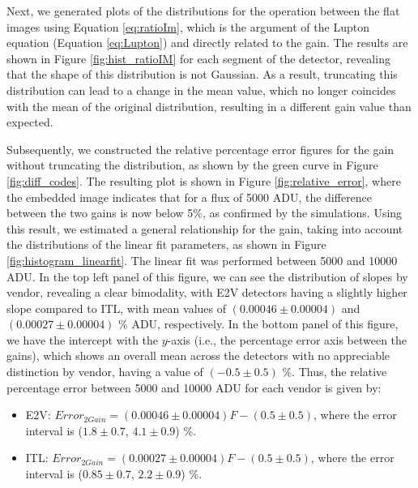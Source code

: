  Next, we generated plots of the distributions for the operation between the flat images using Equation \ref{eq:ratioIm}, which is the argument of the Lupton equation (Equation \ref{eq:Lupton}) and directly related to the gain. The results are shown in Figure \ref{fig:hist_ratioIM} for each segment of the detector, revealing that the shape of this distribution is not Gaussian. As a result, truncating this distribution can lead to a change in the mean value, which no longer coincides with the mean of the original distribution, resulting in a different gain value than expected.
 
\vspace{3mm}

Subsequently, we constructed the relative percentage error figures for the gain without truncating the distribution, as shown by the green curve in Figure \ref{fig:diff_codes}. The resulting plot is shown in Figure \ref{fig:relative_error}, where the embedded image indicates that for a flux of 5000 ADU, the difference between the two gains is now below 5\%, as confirmed by the simulations. Using this result, we estimated a general relationship for the gain, taking into account the distributions of the linear fit parameters, as shown in Figure \ref{fig:histogram_linearfit}. The linear fit was performed between 5000 and 10000 ADU. In the top left panel of this figure, we can see the distribution of slopes by vendor, revealing a clear bimodality, with E2V detectors having a slightly higher slope compared to ITL, with mean values of $(0.00046 \pm 0.00004)$ and $(0.00027 \pm 0.00004)$ \% ADU, respectively. In the bottom panel of this figure, we have the intercept with the $y$-axis (i.e., the percentage error axis between the gains), which shows an overall mean across the detectors with no appreciable distinction by vendor, having a value of $(-0.5 \pm 0.5)$ \%. Thus, the relative percentage error between 5000 and 10000 ADU for each vendor is given by:

\begin{itemize}
    \item E2V: $Error_{2Gain} = (0.00046 \pm 0.00004) F - (0.5 \pm 0.5)$, where the error interval is ($1.8 \pm 0.7$, $4.1 \pm 0.9$) \%.
    \item ITL: $Error_{2Gain} = (0.00027 \pm 0.00004) F - (0.5 \pm 0.5)$, where the error interval is ($0.85 \pm 0.7$, $2.2 \pm 0.9$) \%.
\end{itemize}
 
